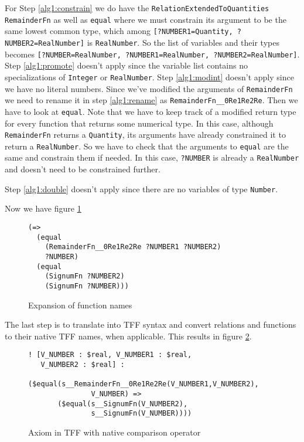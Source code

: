 \documentclass{article}
\begin{document}
\begin{sloppypar}For Step \ref{alg1:constrain} we do have the
\texttt{RelationExtendedToQuantities} \texttt{RemainderFn} as well as
\texttt{equal} where we must constrain its argument to be the same lowest common
type, which among \texttt{[?NUMBER1=Quantity, ?NUMBER2=RealNumber]} is
\texttt{RealNumber}.  So the list of variables and their types becomes
\texttt{[?NUMBER=RealNumber, ?NUMBER1=RealNumber, ?NUMBER2=RealNumber]}.  Step
\ref{alg1:promote} doesn't apply since the variable list contains no specializations
of \texttt{Integer} or \texttt{RealNumber}.  Step \ref{alg1:modint} doesn't apply
since we have no literal numbers. Since we've modified the arguments of
\texttt{RemainderFn} we need to rename it in step \ref{alg1:rename} as
\texttt{RemainderFn\_\_0Re1Re2Re}.  Then we have to look at \texttt{equal}.  Note
that we have to keep track of a modified return type for every function that
returns some numerical type. In this case, although \texttt{RemainderFn} returns
a \texttt{Quantity}, its arguments have already constrained it to return a
\texttt{RealNumber}.  So we have to check that the arguments to \texttt{equal}
are the same and constrain them if needed.  In this case, \texttt{?NUMBER} is
already a \texttt{RealNumber} and doesn't need to be constrained further.
\end{sloppypar}

Step \ref{alg1:double} doesn't
apply since there are no variables of type \texttt{Number}.

Now we have figure \ref{fig:FunctExpand}

\begin{figure}[H]
\begin{framed}
\begin{verbatim}
(=>
  (equal 
    (RemainderFn__0Re1Re2Re ?NUMBER1 ?NUMBER2) 
    ?NUMBER)
  (equal 
    (SignumFn ?NUMBER2) 
    (SignumFn ?NUMBER)))
\end{verbatim}
\end{framed}
\caption{Expansion of function names}
\label{fig:FunctExpand}
\end{figure}

The last step is to translate into TFF syntax and convert relations and functions to
their native TFF names, when applicable.  This results in figure \ref{fig:TFFRemainderFn}.

\begin{figure}[H]
\begin{framed}
\begin{verbatim}
! [V_NUMBER : $real, V_NUMBER1 : $real, 
   V_NUMBER2 : $real] :
       ($equal(s__RemainderFn__0Re1Re2Re(V_NUMBER1,V_NUMBER2),
               V_NUMBER) =>
       ($equal(s__SignumFn(V_NUMBER2),
               s__SignumFn(V_NUMBER))))
\end{verbatim}
\end{framed}
\caption{Axiom in TFF with native comparison operator}
\label{fig:TFFRemainderFn}
\end{figure}
\end{document}
